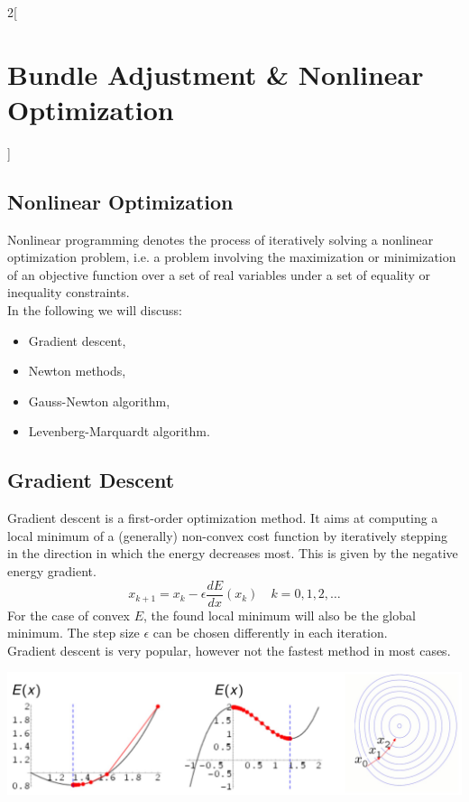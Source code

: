 \documentclass[oneside,fontsize=11pt,paper=a4]{scrartcl}
\newenvironment{myfigure}
  {\par\medskip\noindent\minipage{\linewidth}}
  {\endminipage\par\medskip}
\begin{document}
\begin{multicols}{2}[\section{Bundle Adjustment \& Nonlinear Optimization}]
\subsection{Nonlinear Optimization}
Nonlinear programming denotes the process of iteratively solving a nonlinear optimization problem, i.e. a problem involving the maximization or minimization of an objective function over a set of real variables under a set of equality or inequality constraints. \\
In the following we will discuss:
\begin{itemize}
    \item Gradient descent,
    \item Newton methods,
    \item Gauss-Newton algorithm,
    \item Levenberg-Marquardt algorithm.
\end{itemize}

\subsection{Gradient Descent}
Gradient descent is a first-order optimization method. It aims at computing a local minimum of a (generally) non-convex cost function by iteratively stepping in the direction in which the energy decreases most. This is given by the negative energy gradient.
\begin{equation*}
    x_{k+1} = x_k - \epsilon \frac{dE}{dx} (x_k) \quad k = 0, 1, 2, \ldots
\end{equation*}
For the case of convex $E$, the found local minimum will also be the global minimum. The step size $\epsilon$ can be chosen differently in each iteration.\\
Gradient descent is very popular, however not the fastest method in most cases.

\begin{myfigure}
 \centering
 \includegraphics[width=1.0\linewidth]{Images/Gradient_descent.jpg}
\end{myfigure}


\end{multicols}
\end{document}
